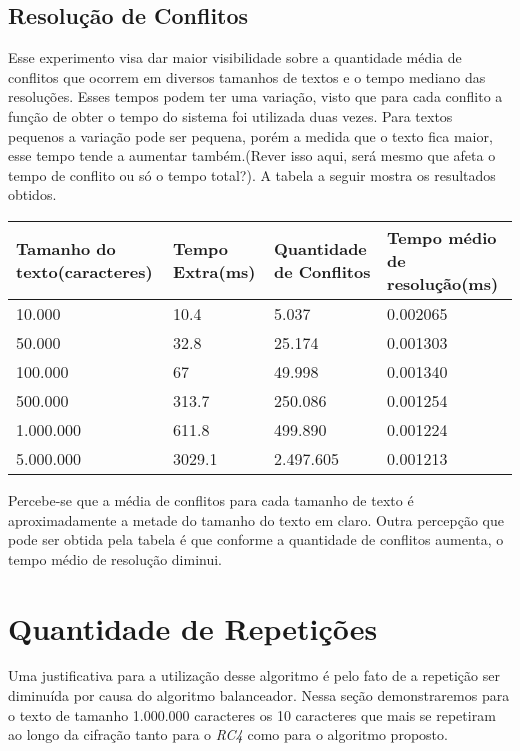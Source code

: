 \subsection{Resolução de Conflitos}

Esse experimento visa dar maior visibilidade sobre a quantidade média de conflitos que ocorrem em diversos tamanhos de textos e o tempo mediano das resoluções. Esses tempos podem ter uma variação, visto que para cada conflito a função de obter o tempo do sistema foi utilizada duas vezes. Para textos pequenos a variação pode ser pequena, porém a medida que o texto fica maior, esse tempo tende a aumentar também.(Rever isso aqui, será mesmo que afeta o tempo de conflito ou só o tempo total?). A tabela a seguir mostra os resultados obtidos.

\begin{table}[h]
\begin{tabular}{|l|l|l|l|}
\hline
Tamanho do texto(caracteres) & Tempo Extra(ms) & Quantidade de Conflitos & Tempo médio de resolução(ms) \\ \hline
10.000                        & 10.4            & 5.037                    & 0.002065                     \\ \hline
50.000                       & 32.8            & 25.174                   & 0.001303                     \\ \hline
100.000                      & 67              & 49.998                   & 0.001340                     \\ \hline
500.000                      & 313.7           & 250.086                  & 0.001254                     \\ \hline
1.000.000                    & 611.8           & 499.890                  & 0.001224                     \\ \hline
5.000.000                    & 3029.1          & 2.497.605                 & 0.001213                     \\ \hline
\end{tabular}
\end{table}

Percebe-se que a média de conflitos para cada tamanho de texto é aproximadamente a metade do tamanho do texto em claro. Outra percepção que pode ser obtida pela tabela é que conforme a quantidade de conflitos aumenta, o tempo médio de resolução diminui.


\section{Quantidade de Repetições}

Uma justificativa para a utilização desse algoritmo é pelo fato de a repetição ser diminuída por causa do algoritmo balanceador. Nessa seção demonstraremos para o texto de tamanho 1.000.000 caracteres os 10 caracteres que mais se repetiram ao longo da cifração tanto para o \textit{RC4} como para o algoritmo proposto.